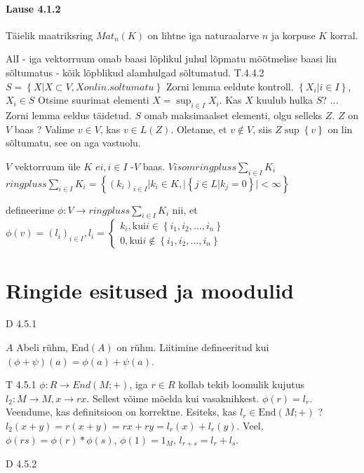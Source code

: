 \documentclass[12pt]{report}
\numberwithin{equation}{section}
\theoremstyle{definition}
\theoremstyle{plain}
\begin{document}
\paragraph{Lause 4.1.2} Täielik maatriksring $Mat_n (K)$ on lihtne iga naturaalarve $n$ ja korpuse $K$ korral. 


AlI - iga vektorruum omab baasi lõplikul juhul
lõpmatu mõõtmelise baasi lin sõltumatus - kõik lõpblikud alamhulgad sõltumatud.
T.4.4.2
$S = \left\{ X | X \subset V, X on lin. soltumatu \right\}$
Zorni lemma eeldute kontroll.
$\left\{ X_i | i \in I \right\}$, $X_i \in S$ Otsime suurimat elementi
$X = \sup_{i \in I} X_i$. Kas $X$ kuulub hulka $S$?
...
Zorni lemma eeldus täidetud.
$S$ omab maksimaalset elementi, olgu selleks $Z$. $Z$ on $V$ baas ? 
Valime $v \in V$, kas $v \in L(Z)$. Oletame, et $v \not \in V$, siis $Z \sup \left\{ v \right\}$ on lin sõltumatu, see on aga vastuolu.

$V$ vektorruum \"ule $K$
$ei, i \in I$ -$V$ baas.
$V isom ringpluss \sum \limits_{i \in I} K_i$
$ringpluss \sum \limits_{i \in I} K_i = \left\{ (k_i)_{i \in I} | k_i \in K, | \left\{ j \in L | k_j = 0 \right\} | < \infty \right\}$

defineerime $\phi: V \to ringpluss \sum \limits_{i \in I} K_i$ nii, et $\phi(v) = (l_i)_{i \in I}, l_i = \begin{cases} k_i, \text{kui} i \in \left\{ i_1,i_2,...,i_n \right\} \\
0, \text{kui} i \not \in \left\{ i_1,i_2,...,i_n \right\}
\end{cases}$

\section{Ringide esitused ja moodulid}
D 4.5.1

$A$ Abeli r\"uhm, End$(A)$ on r\"uhm. Liitimine defineeritud kui $\left( \phi + \psi \right) \left( a \right) = \phi \left( a \right) + \psi \left( a \right)$. 

T 4.5.1
$\phi : R \to End(M;+)$, iga $r \in R$ kollab tekib loomulik kujutus $l_2: M \to M, x \to rx$. Sellest võime mõelda kui vasaknihkest.  $\phi \left( r \right ) = l_r$. Veendume, kas definitsioon on korrektne. Esiteks, kas $l_r \in \text{End}(M;+)$ ? $l_2 (x +y ) = r (x + y ) = rx + ry = l_r(x) + l_r(y)$. Veel, $\phi(rs) = \phi(r) * \phi(s)$, $\phi(1) = 1_M$, $l_{r+s} = l_r + l_s$.

D 4.5.2
\end{document}
